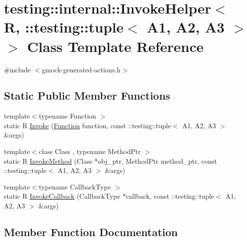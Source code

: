 \hypertarget{classtesting_1_1internal_1_1InvokeHelper_3_01R_00_01_1_1testing_1_1tuple_3_01A1_00_01A2_00_01A3_01_4_01_4}{}\section{testing\+::internal\+::Invoke\+Helper$<$ R, \+::testing\+::tuple$<$ A1, A2, A3 $>$ $>$ Class Template Reference}
\label{classtesting_1_1internal_1_1InvokeHelper_3_01R_00_01_1_1testing_1_1tuple_3_01A1_00_01A2_00_01A3_01_4_01_4}


{\ttfamily \#include $<$gmock-\/generated-\/actions.\+h$>$}

\subsection*{Static Public Member Functions}
\begin{DoxyCompactItemize}
\item 
{\footnotesize template$<$typename Function $>$ }\\static R \mbox{\hyperlink{classtesting_1_1internal_1_1InvokeHelper_3_01R_00_01_1_1testing_1_1tuple_3_01A1_00_01A2_00_01A3_01_4_01_4_a8461645c6bcfb49e465fcfbeb38cd685}{Invoke}} (\mbox{\hyperlink{structtesting_1_1internal_1_1Function}{Function}} function, const \+::testing\+::tuple$<$ A1, A2, A3 $>$ \&args)
\item 
{\footnotesize template$<$class Class , typename Method\+Ptr $>$ }\\static R \mbox{\hyperlink{classtesting_1_1internal_1_1InvokeHelper_3_01R_00_01_1_1testing_1_1tuple_3_01A1_00_01A2_00_01A3_01_4_01_4_a6b2473ea7c58ff4c2ed46c7117fa7baa}{Invoke\+Method}} (Class $\ast$obj\+\_\+ptr, Method\+Ptr method\+\_\+ptr, const \+::testing\+::tuple$<$ A1, A2, A3 $>$ \&args)
\item 
{\footnotesize template$<$typename Callback\+Type $>$ }\\static R \mbox{\hyperlink{classtesting_1_1internal_1_1InvokeHelper_3_01R_00_01_1_1testing_1_1tuple_3_01A1_00_01A2_00_01A3_01_4_01_4_a4b2b3002d1c4a9b0891568bdd4da1a87}{Invoke\+Callback}} (Callback\+Type $\ast$callback, const \+::testing\+::tuple$<$ A1, A2, A3 $>$ \&args)
\end{DoxyCompactItemize}


\subsection{Member Function Documentation}
\mbox{\label{classtesting_1_1internal_1_1InvokeHelper_3_01R_00_01_1_1testing_1_1tuple_3_01A1_00_01A2_00_01A3_01_4_01_4_a8461645c6bcfb49e465fcfbeb38cd685}} 
